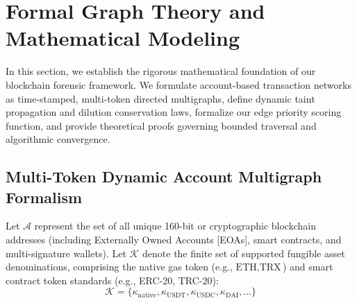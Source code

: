 \section{Formal Graph Theory and Mathematical Modeling}
\label{sec:math_modeling}

In this section, we establish the rigorous mathematical foundation of our blockchain forensic framework. We formulate account-based transaction networks as time-stamped, multi-token directed multigraphs, define dynamic taint propagation and dilution conservation laws, formalize our edge priority scoring function, and provide theoretical proofs governing bounded traversal and algorithmic convergence.

\subsection{Multi-Token Dynamic Account Multigraph Formalism}

Let $\mathcal{A}$ represent the set of all unique 160-bit or cryptographic blockchain addresses (including Externally Owned Accounts [EOAs], smart contracts, and multi-signature wallets). Let $\mathcal{K}$ denote the finite set of supported fungible asset denominations, comprising the native gas token (e.g., $\text{ETH}, \text{TRX}$) and smart contract token standards (e.g., ERC-20, TRC-20):
\begin{equation}
    \mathcal{K} = \{\kappa_{\text{native}}, \kappa_{\text{USDT}}, \kappa_{\text{USDC}}, \kappa_{\text{DAI}}, \dots\}
\end{equation}

